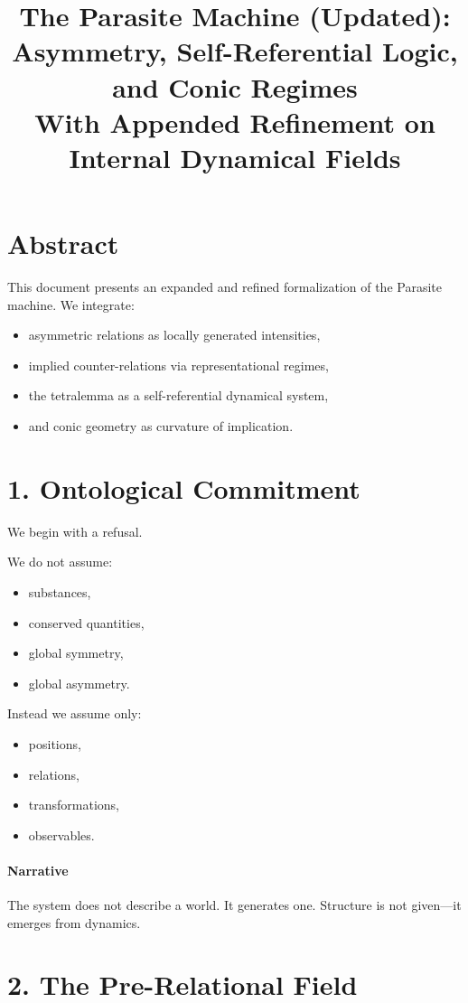 \documentclass[11pt]{article}
\title{The Parasite Machine (Updated):\\
Asymmetry, Self-Referential Logic, and Conic Regimes\\
\large With Appended Refinement on Internal Dynamical Fields}
\author{}
\date{}
\begin{document}
\maketitle

\section*{Abstract}
This document presents an expanded and refined formalization of the Parasite machine.
We integrate:
\begin{itemize}
\item asymmetric relations as locally generated intensities,
\item implied counter-relations via representational regimes,
\item the tetralemma as a self-referential dynamical system,
\item and conic geometry as curvature of implication.
\end{itemize}

\section{1. Ontological Commitment}

We begin with a refusal.

We do not assume:
\begin{itemize}
\item substances,
\item conserved quantities,
\item global symmetry,
\item global asymmetry.
\end{itemize}

Instead we assume only:
\begin{itemize}
\item positions,
\item relations,
\item transformations,
\item observables.
\end{itemize}

\paragraph{Narrative}
The system does not describe a world. It generates one.
Structure is not given---it emerges from dynamics.

\section{2. The Pre-Relational Field}
\end{document}
